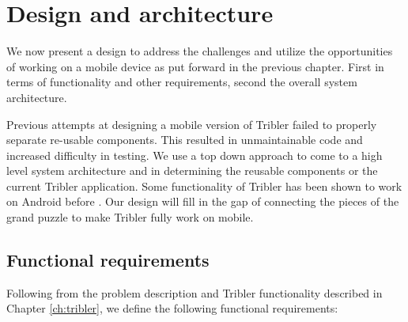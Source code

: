 \chapter{Design and architecture}\label{ch:design}

We now present a design to address the challenges and utilize the opportunities of working on a mobile device as put forward in the previous chapter.
First in terms of functionality and other requirements, second the overall system architecture.

Previous attempts at designing a mobile version of Tribler failed to properly separate re-usable components.
This resulted in unmaintainable code and increased difficulty in testing.
We use a top down approach to come to a high level system architecture and in determining the reusable components or the current Tribler application.
Some functionality of Tribler has been shown to work on Android before \cite{bsc1,2,3}.
Our design will fill in the gap of connecting the pieces of the grand puzzle to make Tribler fully work on mobile.


\section{Functional requirements}\label{sec:func_req}

Following from the problem description and Tribler functionality described in Chapter \ref{ch:tribler}, we define the following functional requirements:


